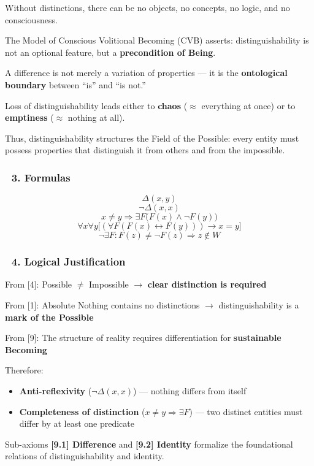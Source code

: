 \documentclass[12pt]{article}
\begin{document}
Without distinctions, there can be no objects, no concepts, no logic, and no consciousness.

The Model of Conscious Volitional Becoming (CVB) asserts: distinguishability is not an optional feature, but a \textbf{precondition of Being}.

A difference is not merely a variation of properties — it is the \textbf{ontological boundary} between ``is'' and ``is not.''

Loss of distinguishability leads either to \textbf{chaos} ($\approx$ everything at once) or to \textbf{emptiness} ($\approx$ nothing at all).

Thus, distinguishability structures the Field of the Possible: every entity must possess properties that distinguish it from others and from the impossible.

\subsubsection*{🔹 3. Formulas}
\[
\Delta(x, y)
\]
\[
\neg \Delta(x, x)
\]
\[
x \neq y \Rightarrow \exists F \big(F(x) \wedge \neg F(y)\big)
\]
\[
\forall x \forall y \bigl[(\forall F (F(x) \leftrightarrow F(y))) \rightarrow x = y\bigr]
\]
\[
\neg \exists F: F(z) \neq \neg F(z) \Rightarrow z \notin W
\]

\subsubsection*{🔹 4. Logical Justification}
From [4]: Possible $\neq$ Impossible $\rightarrow$ \textbf{clear distinction is required}

From [1]: Absolute Nothing contains no distinctions $\rightarrow$ distinguishability is a \textbf{mark of the Possible}

From [9]: The structure of reality requires differentiation for \textbf{sustainable Becoming}

\bigskip
Therefore:
\begin{itemize}
\item \textbf{Anti-reflexivity} ($\neg \Delta(x,x)$) — nothing differs from itself
\item \textbf{Completeness of distinction} ($x \neq y \Rightarrow \exists F$) — two distinct entities must differ by at least one predicate
\end{itemize}

Sub-axioms \textbf{[9.1] Difference} and \textbf{[9.2] Identity} formalize the foundational relations of distinguishability and identity.
\end{document}
